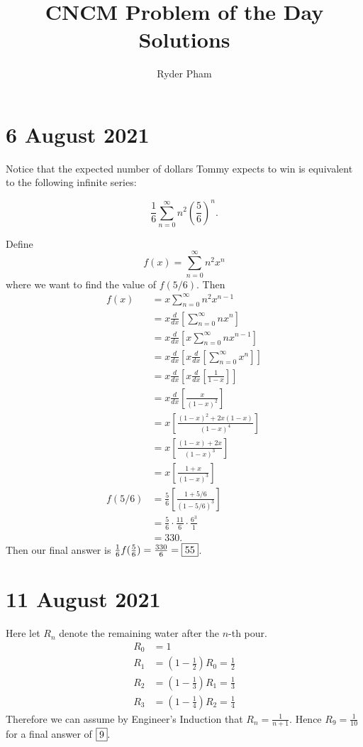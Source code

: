 \documentclass[letterpaper,oneside]{book}
\begin{document}
\title{CNCM Problem of the Day Solutions}
\author{Ryder Pham}
\maketitle

\section*{6 August 2021}

Notice that the expected number of dollars Tommy expects to win is equivalent to the following infinite series:

$$\frac16 \sum_{n=0}^\infty n^2\left(\frac56\right)^n.$$

Define 
$$f(x) = \sum_{n=0}^\infty n^2x^n$$
where we want to find the value of $f(5/6)$.
Then
\begin{align*}
    f(x) &= x\sum_{n=0}^\infty n^2x^{n-1}\\
    &= x\frac{d}{dx}\left[\sum_{n=0}^\infty nx^n\right] \\
    &= x\frac{d}{dx}\left[x\sum_{n=0}^\infty nx^{n-1}\right] \\
    &= x\frac{d}{dx}\left[x\frac{d}{dx}\left[\sum_{n=0}^\infty x^n\right]\right] \\
    &= x\frac{d}{dx}\left[x\frac{d}{dx}\left[\frac{1}{1-x}\right]\right] \\
    &= x\frac{d}{dx}\left[\frac{x}{(1-x)^2}\right] \\
    &= x\left[\frac{(1-x)^2+2x(1-x)}{(1-x)^4}\right] \\
    &= x\left[\frac{(1-x)+2x}{(1-x)^3}\right] \\
    &= x\left[\frac{1+x}{(1-x)^3}\right] \\
    f(5/6) &= \frac56 \left[\frac{1+5/6}{(1-5/6)^3}\right] \\
    &= \frac56 \cdot \frac{11}{6} \cdot \frac{6^3}{1} \\
    &= 330.
\end{align*}
Then our final answer is $\frac16 f(\frac56) = \frac{330}{6}= \fbox{55}$.

\section*{11 August 2021}
Here let $R_n$ denote the remaining water after the $n$-th pour. 
\begin{align*}
    R_0 &= 1 \\
    R_1 &= \left(1-\frac{1}{2}\right)R_0 = \frac{1}{2}\\
    R_2 &= \left(1-\frac{1}{3}\right)R_1 = \frac{1}{3}\\ 
    R_3 &= \left(1-\frac{1}{4}\right)R_2 = \frac{1}{4}
\end{align*}
Therefore we can assume by Engineer's Induction that $R_n = \frac{1}{n+1}.$ Hence $R_9 = \frac{1}{10}$ for a final answer of $\fbox{9}.$
\end{document}
